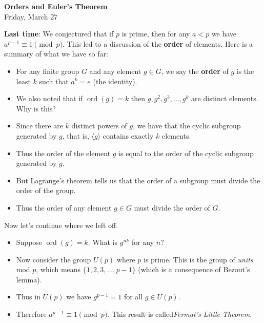 \documentclass[12pt]{article}
\theoremstyle{plain}
\theoremstyle{definition}
\theoremstyle{remark}
\def\lt{<}
\DeclareMathOperator{\ord}{ord}
\begin{document}
\Large
\begin{center}
 \textbf{\LARGE Orders and Euler's Theorem}\\
 Friday, March 27
\end{center}

\textbf{Last time}:  We conjectured that if \(p\) is prime, then for any \(a \lt p\) we have \(a^{p-1} \equiv 1 \pmod{p}\).  This led to a discussion of the \textbf{order} of elements.  Here is a summary of what we have so far:%
\begin{itemize}[label=\textbullet]
\item{}For any finite group \(G\) and any element \(g \in G\), we say the \textbf{order} of \(g\) is the least \(k\) such that \(a^k = e\) (the identity).%
\item{}We also noted that if \(\ord(g) = k\) then \(g, g^2, g^3,\ldots, g^k\) are distinct elements.  Why is this?%
\vskip 2in
\item{}Since there are \(k\) distinct powers of \(g\), we have that the cyclic subgroup generated by \(g\), that is, \(\langle g \rangle\) contains exactly \(k\) elements.%
\item{}Thus the order of the element \(g\) is equal to the order of the cyclic subgroup generated by \(g\).%
\item{}But Lagrange's theorem tells us that the order of a subgroup must divide the order of the group.%
\item{}Thus the order of any element \(g \in G\) must divide the order of \(G\).%
\end{itemize}
\clearpage
%
\par
Now let's continue where we left off.%
\begin{itemize}[label=\textbullet]
\item{}Suppose \(\ord(g) = k\).  What is \(g^{nk}\) for any \(n\)?%
\vskip 3in

\item{}Now consider the group \(U(p)\) where \(p\) is prime.  This is the group of \emph{units} mod \(p\), which means \(\{1,2,3,\ldots, p-1\}\) (which is a consequence of Bezout's lemma).%
\vskip 3in
\item{}Thus in \(U(p)\) we have \(g^{p-1} = 1\) for all \(g \in U(p)\).%
\item{}Therefore \(a^{p-1} \equiv 1 \pmod{p}\).  This result is called\emph{Fermat's Little Theorem}.%
\end{itemize}
\end{document}
